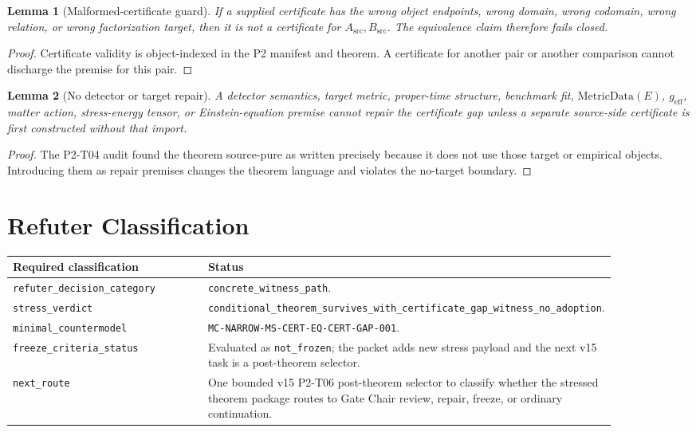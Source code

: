 \documentclass[11pt]{article}
\newcommand{\Asrc}{A_{\mathrm{src}}}
\newcommand{\Bsrc}{B_{\mathrm{src}}}
\newcommand{\MetricData}{\mathrm{MetricData}}
\newcommand{\geff}{g_{\mathrm{eff}}}
\newtheorem{lemma}{Lemma}
\begin{document}
\begin{lemma}[Malformed-certificate guard]
If a supplied certificate has the wrong object endpoints, wrong domain,
wrong codomain, wrong relation, or wrong factorization target, then it is not
a certificate for \(\Asrc,\Bsrc\). The equivalence claim therefore fails
closed.
\end{lemma}

\begin{proof}
Certificate validity is object-indexed in the P2 manifest and theorem. A
certificate for another pair or another comparison cannot discharge the
premise for this pair.
\end{proof}

\begin{lemma}[No detector or target repair]
A detector semantics, target metric, proper-time structure, benchmark fit,
\(\MetricData(E)\), \(\geff\), matter action, stress-energy tensor, or
Einstein-equation premise cannot repair the certificate gap unless a separate
source-side certificate is first constructed without that import.
\end{lemma}

\begin{proof}
The P2-T04 audit found the theorem source-pure as written precisely because it
does not use those target or empirical objects. Introducing them as repair
premises changes the theorem language and violates the no-target boundary.
\end{proof}

\section{Refuter Classification}

\begin{longtable}{p{0.34\linewidth}p{0.54\linewidth}}
\toprule
Required classification & Status \\
\midrule
\texttt{refuter\_decision\_category} &
\texttt{concrete\_witness\_path}. \\
\texttt{stress\_verdict} &
\texttt{conditional\_theorem\_survives\_with\_certificate\_gap\_witness\_no\_adoption}. \\
\texttt{minimal\_countermodel} &
\texttt{MC-NARROW-MS-CERT-EQ-CERT-GAP-001}. \\
\texttt{freeze\_criteria\_status} &
Evaluated as \texttt{not\_frozen}; the packet adds new stress payload and the
next v15 task is a post-theorem selector. \\
\texttt{next\_route} &
One bounded v15 P2-T06 post-theorem selector to classify whether the stressed
theorem package routes to Gate Chair review, repair, freeze, or ordinary
continuation. \\
\bottomrule
\end{longtable}
\end{document}
